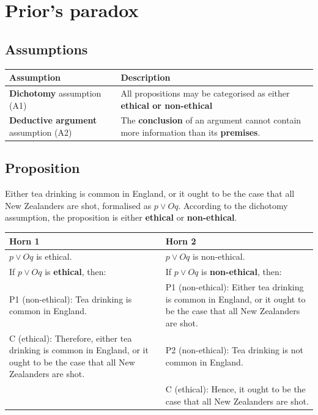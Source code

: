 \documentclass[11pt]{article}
\begin{document}
 \newpage
\section{Prior's paradox}
\label{sec:orgd98d9b2}

\subsection{Assumptions}
\label{sec:org86127c8}
\begin{center}
\begin{tabular}{|m{5em}|m{25em}|}
\hline
Assumption & Description\\
\hline
\textbf{Dichotomy} assumption (A1) & All propositions may be categorised as either \textbf{ethical or non-ethical}\\
\hline
\textbf{Deductive argument} assumption (A2) & The \textbf{conclusion} of an argument cannot contain more information than its \textbf{premises}.\\
\hline
\end{tabular}
\end{center}
\subsection{Proposition}
\label{sec:orga874ee4}
Either tea drinking is common in England, or it ought to be the case that all New Zealanders are shot, formalised as \(p \vee Oq\). According to the dichotomy assumption, the proposition is either \textbf{ethical} or \textbf{non-ethical}.

\begin{center}
\begin{tabularx}{\textwidth}{|X|X|}
\hline
Horn 1 & Horn 2\\
\hline
\(p \vee Oq\) is ethical. & \(p \vee Oq\) is non-ethical.\\
\hline
If \(p \vee Oq\) is \textbf{ethical}, then: & If \(p \vee Oq\) is \textbf{non-ethical}, then:\\
P1 (non-ethical): Tea drinking is common in England. & P1 (non-ethical): Either tea drinking is common in England, or it ought to be the case that all New Zealanders are shot.\\
C (ethical): Therefore, either tea drinking is common in England, or it ought to be the case that all New Zealanders are shot. & P2 (non-ethical): Tea drinking is not common in England.\\
 & C (ethical): Hence, it ought to be the case that all New Zealanders are shot.\\
\hline
\end{tabularx}
\end{center}
 \newpage
\end{document}
